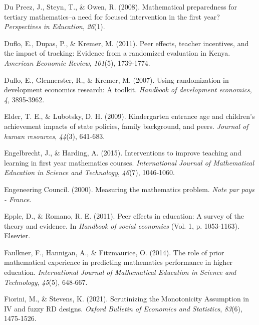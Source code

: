 \documentclass[
]{book}
\newlength{\cslhangindent}
\newlength{\cslentryspacingunit} %
\newenvironment{CSLReferences}[2] %
 {%
  \setlength{\parindent}{0pt}
  \ifodd #1
  \let\oldpar\par
  \def\par{\hangindent=\cslhangindent\oldpar}
  \fi
  \setlength{\parskip}{#2\cslentryspacingunit}
 }%
 {}
\begin{document}
\begin{CSLReferences}{1}{2}
\leavevmode{}%
Du Preez, J., Steyn, T., \& Owen, R. (2008). Mathematical preparedness for tertiary mathematics--a need for focused intervention in the first year? \emph{Perspectives in Education}, \emph{26}(1).

\leavevmode{}%
Duflo, E., Dupas, P., \& Kremer, M. (2011). Peer effects, teacher incentives, and the impact of tracking: Evidence from a randomized evaluation in Kenya. \emph{American Economic Review}, \emph{101}(5), 1739‑1774.

\leavevmode{}%
Duflo, E., Glennerster, R., \& Kremer, M. (2007). Using randomization in development economics research: A toolkit. \emph{Handbook of development economics}, \emph{4}, 3895‑3962.

\leavevmode{}%
Elder, T. E., \& Lubotsky, D. H. (2009). Kindergarten entrance age and children's achievement impacts of state policies, family background, and peers. \emph{Journal of human resources}, \emph{44}(3), 641‑683.

\leavevmode{}%
Engelbrecht, J., \& Harding, A. (2015). Interventions to improve teaching and learning in first year mathematics courses. \emph{International Journal of Mathematical Education in Science and Technology}, \emph{46}(7), 1046‑1060.

\leavevmode{}%
Engeneering Council. (2000). Measuring the mathematics problem. \emph{Note par pays - France}.

\leavevmode{}%
Epple, D., \& Romano, R. E. (2011). Peer effects in education: A survey of the theory and evidence. In \emph{Handbook of social economics} (Vol. 1, p. 1053‑1163). Elsevier.

\leavevmode{}%
Faulkner, F., Hannigan, A., \& Fitzmaurice, O. (2014). The role of prior mathematical experience in predicting mathematics performance in higher education. \emph{International Journal of Mathematical Education in Science and Technology}, \emph{45}(5), 648‑667.

\leavevmode{}%
Fiorini, M., \& Stevens, K. (2021). Scrutinizing the Monotonicity Assumption in IV and fuzzy RD designs. \emph{Oxford Bulletin of Economics and Statistics}, \emph{83}(6), 1475‑1526.


\end{CSLReferences}
\end{document}
